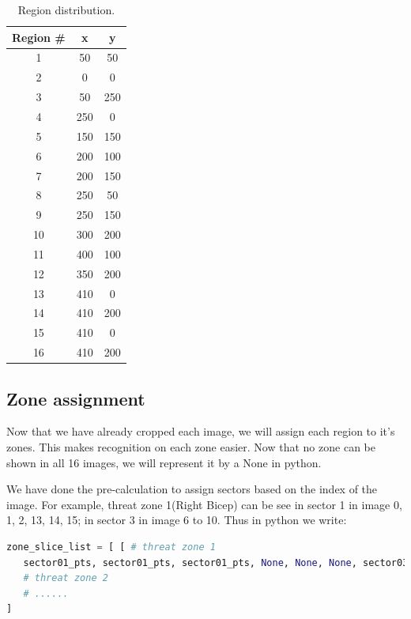 \documentclass[conference,compsoc]{IEEEtran}
\begin{document}
		\begin{table}[h]
			\centering
			\label{region}
			\begin{tabular}{ccc}
				\hline
				Region \# & x   & y   \\ \hline
				1         & 50  & 50  \\ \hline
				2         & 0   & 0   \\ \hline
				3         & 50  & 250 \\ \hline
				4         & 250 & 0   \\ \hline
				5         & 150 & 150 \\ \hline
				6         & 200 & 100 \\ \hline
				7         & 200 & 150 \\ \hline
				8         & 250 & 50  \\ \hline
				9         & 250 & 150 \\ \hline
				10        & 300 & 200 \\ \hline
				11        & 400 & 100 \\ \hline
				12        & 350 & 200 \\ \hline
				13        & 410 & 0   \\ \hline
				14        & 410 & 200 \\ \hline
				15        & 410 & 0   \\ \hline
				16        & 410 & 200 \\ \hline
			\end{tabular}
			\caption{Region distribution.}
		\end{table}
	\subsection{Zone assignment}
		\par Now that we have already cropped each image, we will assign each region to it's zones. This makes recognition on each zone easier. Now that no zone can be shown in all 16 images, we will represent it by a None in python.
		\par We have done the pre-calculation to assign sectors based on the index of the image. For example, threat zone 1(Right Bicep) can be see in sector 1 in image 0, 1, 2, 13, 14, 15; in sector 3 in image 6 to 10. Thus in python we write:
		\begin{lstlisting}[language = python]
zone_slice_list = [ [ # threat zone 1
   sector01_pts, sector01_pts, sector01_pts, None, None, None, sector03_pts, sector03_pts, sector03_pts, sector03_pts, sector03_pts, None, None, sector01_pts, sector01_pts, sector01_pts ],
   # threat zone 2
   # ...... 
]
		\end{lstlisting}
\end{document}

